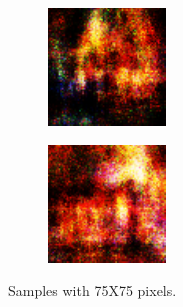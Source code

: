 \begin{figure}[htb!]
\begin{subfigure}[htb!]{0.3\linewidth}
        \caption{}
        \end{subfigure}
        \begin{subfigure}[htb!]{0.3\linewidth}
        \includegraphics[width=\linewidth]{10000-3(7575).pdf}
        \caption{}
        \end{subfigure}
        \begin{subfigure}[htb!]{0.3\linewidth}
        \includegraphics[width=\linewidth]{10000-4(7575).pdf}
        \caption{}
        \end{subfigure}
        \caption{Samples with 75X75 pixels.}
        \label{fig:coffee3}
    \end{figure}


